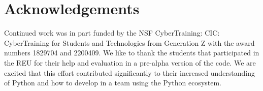 

\section*{Acknowledgements}

Continued work was in part funded by the NSF CyberTraining: CIC:
CyberTraining for Students and Technologies from Generation Z with the
award numbers 1829704 and 2200409. We like to thank the students that
participated in the REU for their help and evaluation in a pre-alpha
version of the code. We are excited that this effort contributed
significantly to their increased understanding of Python and how to
develop in a team using the Python ecosystem.

